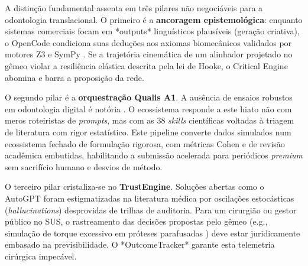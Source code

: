 A distinção fundamental assenta em três pilares não negociáveis para a odontologia translacional. O primeiro é a \textbf{ancoragem epistemológica}: enquanto sistemas comerciais focam em *outputs* linguísticos plausíveis (geração criativa), o OpenCode condiciona suas deduções aos axiomas biomecânicos validados por motores Z3 e SymPy \cite{opencode2026ecosystem}. Se a trajetória cinemática de um alinhador projetado no gêmeo violar a resiliência elástica descrita pela lei de Hooke, o Critical Engine abomina e barra a proposição da rede.

O segundo pilar é a \textbf{orquestração Qualis A1}. A ausência de ensaios robustos em odontologia digital é notória \cite{duggal2026exploring}. O ecossistema responde a este hiato não com meros roteiristas de \textit{prompts}, mas com as 38 \textit{skills} científicas voltadas à triagem de literatura com rigor estatístico. Este pipeline converte dados simulados num ecossistema fechado de formulação rigorosa, com métricas Cohen e de revisão acadêmica embutidas, habilitando a submissão acelerada para periódicos \textit{premium} sem sacrifício humano e desvios de método.

O terceiro pilar cristaliza-se no \textbf{TrustEngine}. Soluções abertas como o AutoGPT foram estigmatizadas na literatura médica por oscilações estocásticas (\textit{hallucinations}) desprovidas de trilhas de auditoria. Para um cirurgião ou gestor público no SUS, o rastreamento das decisões propostas pelo gêmeo (e.g., simulação de torque excessivo em próteses parafusadas \cite{alshadidi2024surface}) deve estar juridicamente embasado na previsibilidade. O *OutcomeTracker* garante esta telemetria cirúrgica impecável.
